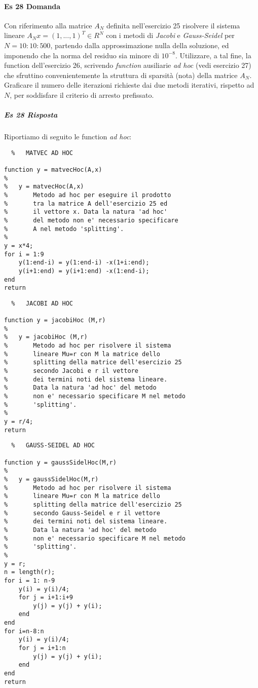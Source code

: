 \documentclass[a4paper]{report}
\begin{document}
\paragraph{Es 28 Domanda}	
Con riferimento alla matrice $A_N$ definita nell'esercizio 25 risolvere il sistema lineare $A_N x = (1,...,1)^T \in R^N$ con i metodi di \emph{Jacobi} e \emph{Gauss-Seidel} per $N = 10:10:500$, partendo dalla
approssimazione nulla della soluzione, ed imponendo che la norma del residuo sia
minore di $10^{-8}$. Utilizzare, a tal fine, la function dell'esercizio 26, scrivendo \emph{function}
ausiliarie \emph{ad hoc} (vedi esercizio 27) che sfruttino convenientemente la struttura di sparsità (nota) della matrice $A_N$. Graficare il numero delle iterazioni richieste dai
due metodi iterativi, rispetto ad $N$, per soddisfare il criterio di arresto prefissato.
\subparagraph{Es 28 Risposta}
Riportiamo di seguito le function \emph{ad hoc}:\\
\begin{lstlisting}	%	MATVEC AD HOC

function y = matvecHoc(A,x)
%
%   y = matvecHoc(A,x)
%       Metodo ad hoc per eseguire il prodotto
%       tra la matrice A dell'esercizio 25 ed
%       il vettore x. Data la natura 'ad hoc'
%       del metodo non e' necessario specificare
%       A nel metodo 'splitting'.
%
y = x*4;
for i = 1:9
	y(1:end-i) = y(1:end-i) -x(1+i:end);
	y(i+1:end) = y(i+1:end) -x(1:end-i); 
end
return
\end{lstlisting}
\begin{lstlisting}	%	JACOBI AD HOC

function y = jacobiHoc (M,r)
%
%   y = jacobiHoc (M,r)
%       Metodo ad hoc per risolvere il sistema
%       lineare Mu=r con M la matrice dello
%       splitting della matrice dell'esercizio 25
%       secondo Jacobi e r il vettore
%       dei termini noti del sistema lineare.
%       Data la natura 'ad hoc' del metodo
%       non e' necessario specificare M nel metodo
%       'splitting'.
%
y = r/4;
return
\end{lstlisting}
\newpage
\begin{lstlisting}	%	GAUSS-SEIDEL AD HOC

function y = gaussSidelHoc(M,r)
%
%   y = gaussSidelHoc(M,r)
%       Metodo ad hoc per risolvere il sistema
%       lineare Mu=r con M la matrice dello
%       splitting della matrice dell'esercizio 25
%       secondo Gauss-Seidel e r il vettore
%       dei termini noti del sistema lineare.
%       Data la natura 'ad hoc' del metodo
%       non e' necessario specificare M nel metodo
%       'splitting'.
%
y = r;
n = length(r);
for i = 1: n-9
	y(i) = y(i)/4;
	for j = i+1:i+9
		y(j) = y(j) + y(i); 
	end 
end
for i=n-8:n
	y(i) = y(i)/4;
	for j = i+1:n
		y(j) = y(j) + y(i);
	end
end
return
\end{lstlisting}
\end{document}
